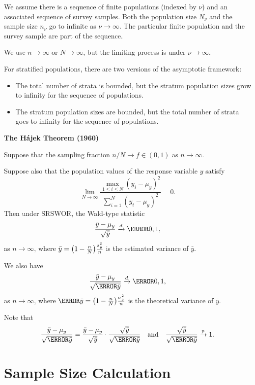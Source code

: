 We assume there is a sequence of finite populations (indexed by $ \nu $)
and an associated sequence of survey samples. Both the population size $ N_\nu $ and the sample
size $ n_\nu $ go to infinite as $ \nu\to\infty $. The particular finite population and the survey
sample are part of the sequence.

We use $ n\to\infty $ or $ N\to\infty $, but the limiting process is under $ \nu\to\infty $.

For stratified populations, there are two versions of the asymptotic framework:
\begin{itemize}
      \item The total number of strata is bounded, but the stratum population sizes grow to infinity
            for the sequence of populations.
      \item The stratum population sizes are bounded, but the total number of
            strata goes to infinity for the sequence of populations.
\end{itemize}

\textbf{The Hájek Theorem (1960)}

Suppose that the sampling fraction $ n/N\to f\in(0,1) $ as $ n\to\infty $.

Suppose also that the population values of the response variable $ y $ satisfy
\[ \lim\limits_{{N} \to {\infty}}\frac{\max_{1\le i\le N}{(y_i-\mu_y)^2}}{\sum_{i=1}^{N}(y_i-\mu_y)^2}=0. \]
Then under SRSWOR, the Wald-type statistic
\[ \frac{\bar{y}-\mu_y}{\sqrt{\v{\bar{y}}}}\tod \N{0,1}, \]
as $ n\to\infty $, where $ \relax{\bar{y}}=\bigl(1-\frac{n}{N}\bigr)\frac{s_y^2}{n} $ is the estimated variance of $ \bar{y} $.

We also have
\[ \frac{\bar{y}-\mu_y}{\sqrt{\V{\bar{y}}}}\tod \N{0,1}, \]
as $ n\to\infty $, where $ \V{\bar{y}}=\bigl(1-\frac{n}{N}\bigr)\frac{\sigma_y^2}{n} $ is the theoretical variance of $ \bar{y} $.

Note that
\[ \frac{\bar{y}-\mu_y}{\sqrt{\V{\bar{y}}}}=\frac{\bar{y}-\mu_y}{\sqrt{\v{\bar{y}}}}\cdot \frac{\sqrt{\v{\bar{y}}}}{\sqrt{\V{\bar{y}}}}\quad\text{and}\quad \frac{\sqrt{\v{\bar{y}}}}{\sqrt{\V{\bar{y}}}}\inp 1. \]

\section{Sample Size Calculation}

